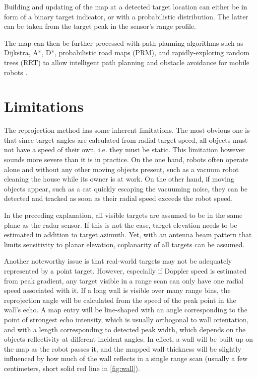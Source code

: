 Building and updating of the map at a detected target location can either be in form of a binary target indicator, or with a probabilistic distribution. The latter can be taken from the target peak in the sensor's range profile.

The map can then be further processed with path planning algorithms such as Dijkstra, A*, D*, probabilistic road maps (PRM), and rapidly-exploring random trees (RRT) to allow intelligent path planning and obstacle avoidance for mobile robots \cite{Correll2016}.

\section{Limitations}\label{limitations}

The reprojection method has some inherent limitations. The most obvious one is that since target angles are calculated from radial target speed, all objects must not have a speed of their own, i.e. they must be static. This limitation however sounds more severe than it is in practice. On the one hand, robots often operate alone and without any other moving objects present, such as a vacuum robot cleaning the house while its owner is at work. On the other hand, if moving objects appear, such as a cat quickly escaping the vacuuming noise, they can be detected and tracked as soon as their radial speed exceeds the robot speed.

In the preceding explanation, all visible targets are assumed to be in the same plane as the radar sensor. If this is not the case, target elevation needs to be estimated in addition to target azimuth. Yet, with an antenna beam pattern that limits sensitivity to planar elevation, coplanarity of all targets can be assumed.

Another noteworthy issue is that real-world targets may not be adequately represented by a point target. However, especially if Doppler speed is estimated from peak gradient, any target visible in a range scan can only have one radial speed associated with it. If a long wall is visible over many range bins, the reprojection angle will be calculated from the speed of the peak point in the wall's echo. A map entry will be line-shaped with an angle corresponding to the point of strongest echo intensity, which is usually orthogonal to wall orientation, and with a length corresponding to detected peak width, which depends on the objects reflectivity at different incident angles. In effect, a wall will be built up on the map as the robot passes it, and the mapped wall thickness will be slightly influenced by how much of the wall reflects in a single range scan (usually a few centimeters, short solid red line in \cref{fig:wall}).


